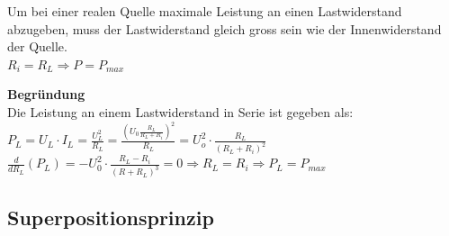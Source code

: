 										\beginip
										Um bei einer realen Quelle maximale Leistung an einen Lastwiderstand abzugeben, muss der Lastwiderstand gleich gross sein wie der Innenwiderstand der Quelle. \\
										\formulaBegin
										$ R_i = R_L \Rightarrow P = P_{max}$
										\formulaEnd
										\begin{center}
										\end{center}
										\iend

					\newpage
										\textbf{Begründung} \\
										Die Leistung an einem Lastwiderstand in Serie ist gegeben als: \\
										$ \displaystyle P_L = U_L \cdot I_L = \frac{U_L^2}{R_L} = \frac{( U_0 \frac{R_L}{R_L + R_i})^2}{R_L} = U_o^2 \cdot \frac{R_L}{(R_L + R_i)^2}$ \\
										$\displaystyle \frac{d}{dR_L} (P_L) = - U_0^2 \cdot \frac{R_L - R_i}{(R + R_L)^3} = 0 \Rightarrow R_L = R_i  \Rightarrow P_L = P_{max}$

										\subsection{Superpositionsprinzip}

